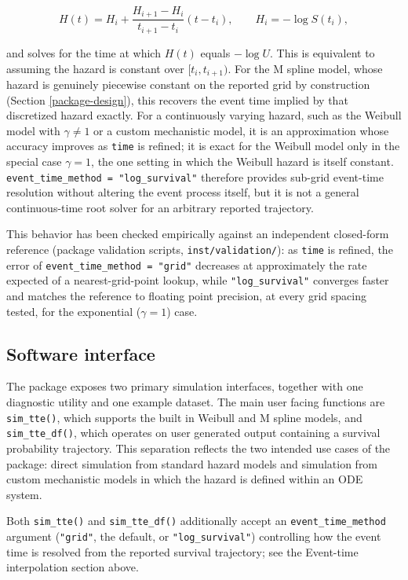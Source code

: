 \[H(t) = H_i + \frac{H_{i+1} - H_i}{t_{i+1} - t_i}(t - t_i), \qquad H_i = -\log S(t_i),\]

and solves for the time at which \(H(t)\) equals \(-\log U\). This is equivalent to assuming the hazard is constant over \([t_i, t_{i+1})\). For the M spline model, whose hazard is genuinely piecewise constant on the reported grid by construction (Section \ref{package-design}), this recovers the event time implied by that discretized hazard exactly. For a continuously varying hazard, such as the Weibull model with \(\gamma \neq 1\) or a custom mechanistic model, it is an approximation whose accuracy improves as \texttt{time} is refined; it is exact for the Weibull model only in the special case \(\gamma = 1\), the one setting in which the Weibull hazard is itself constant. \texttt{event\_time\_method\ =\ "log\_survival"} therefore provides sub-grid event-time resolution without altering the event process itself, but it is not a general continuous-time root solver for an arbitrary reported trajectory.

This behavior has been checked empirically against an independent closed-form reference (package validation scripts, \texttt{inst/validation/}): as \texttt{time} is refined, the error of \texttt{event\_time\_method\ =\ "grid"} decreases at approximately the rate expected of a nearest-grid-point lookup, while \texttt{"log\_survival"} converges faster and matches the reference to floating point precision, at every grid spacing tested, for the exponential (\(\gamma = 1\)) case.

\subsection{Software interface}\label{software-interface}

The package exposes two primary simulation interfaces, together with one diagnostic utility and one example dataset. The main user facing functions are \texttt{sim\_tte()}, which supports the built in Weibull and M spline models, and \texttt{sim\_tte\_df()}, which operates on user generated  output containing a survival probability trajectory. This separation reflects the two intended use cases of the package: direct simulation from standard hazard models and simulation from custom mechanistic models in which the hazard is defined within an ODE system.

Both \texttt{sim\_tte()} and \texttt{sim\_tte\_df()} additionally accept an \texttt{event\_time\_method} argument (\texttt{"grid"}, the default, or \texttt{"log\_survival"}) controlling how the event time is resolved from the reported survival trajectory; see the Event-time interpolation section above.

